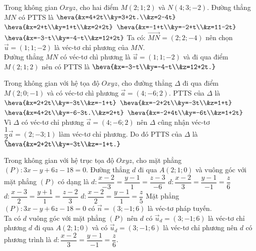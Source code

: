 \begin{ex}%
	Trong không gian $O x y z$, cho hai điểm $M(2;1;2)$ và $N(4;3;-2)$. Đường thẳng $MN$ có PTTS là 
	\choice 
	{$\heva{&x=4+2t\\&y=3+2t.\\&z=2-4t}$}
		{$\heva{&x=2+t\\&y=1+t\\&z=2+2t}$}
			{$\heva{&x=-1+t\\&y=-2+t\\&z=11-2t}$}
				{\True $\heva{&x=-3-t\\&y=-4-t\\&z=12+2t}$}
					\loigiai 
					{
	Ta có: $\vec{MN}=(2;2;-4)$ nên chọn $\vec{u}=(1;1;-2)$ là véc-tơ chỉ phương của $MN$.\\
	Đường thẳng $MN$ có véc-tơ chì phương là $\vec{u}=(1;1;-2)$ và đi qua điểm $M(2;1;2)$ nên có PTTS là $\heva{&x=-3-t\\&y=-4-t\\&z=12+2t.}$
					}
				\end{ex}
	
\begin{ex}%
	Trong không gian với hệ tọa độ $O x y z$, cho đường thẳng $\Delta$ đi qua điểm $M(2;0;-1)$ và có véc-tơ chì phương $\vec{a}=(4;-6;2)$. PTTS của $\Delta$ là 
	\choice 
	{\True $\heva{&x=2+2t\\&y=-3t\\&z=-1+t}$}
		{$\heva{&x=-2+2t\\&y=-3t\\&z=1+t}$}
			{$\heva{&x=4+2t\\&y=-6-3t.\\&z=2+t}$}
				{$\heva{&x=-2+4t\\&y=-6t\\&z=1+2t}$}
					\loigiai 
					{
Vì $\Delta$ có véc-tơ chỉ phương $\vec{a}=(4;-6;2)$ nên $\Delta$ cũng nhận véc-tơ $\dfrac{1}{2}\vec{a}=(2;-3;1)$ làm véc-tơ chỉ phương. Do đó PTTS của $\Delta$ là $\heva{&x=2+2t\\&y=-3t\\&z=-1+t.}$
					}
\end{ex}

\begin{ex}%
	Trong không gian với hệ trục tọa độ $O x y z$, cho mặt phẳng $(P)\colon 3x-y+6z-18=0$. Đường thẳng $d$ đi qua $A(2;1;0)$ và vuông góc với mặt phẳng $(P)$ có dạng là 
	\choice 
	{$d\colon\dfrac{x-2}{-3}=\dfrac{y-1}{1}=\dfrac{z-3}{-6}$}
	{\True $d\colon\dfrac{x-2}{3}=\dfrac{y-1}{-1}=\dfrac{z}{6}$}
	{$d\colon\dfrac{x-3}{2}=\dfrac{y+1}{1}=\dfrac{z-2}{3}$}
	{$d\colon\dfrac{x-2}{2}=\dfrac{y-1}{1}=\dfrac{z}{5}$}
	\loigiai 
	{
Mặt phẳng $(P)\colon 3x-y+6z-18=0$ có $\vec{n}=(3;-1;6)$ là véc-tơ pháp tuyến.\\
Ta có $d$ vuông góc với mặt phẳng $(P)$ nên $d$ có $\vec{u}_d=(3;-1;6)$ là véc-tơ chỉ phương $d$ đi qua $A(2;1;0)$ và có $\vec{u}_d=(3;-1;6)$ là véc-tơ chỉ phương nên $d$ có phương trình là $d\colon \dfrac{x-2}{3}=\dfrac{y-1}{-1}=\dfrac{z}{6}$.
	}
\end{ex}

